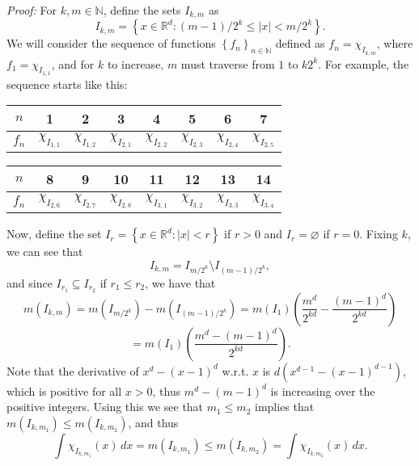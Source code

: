\documentclass[12pt]{article}
\newcommand{\N}{\ensuremath{\mathbb{N}}}
\newcommand{\R}{\ensuremath{\mathbb{R}}}
\newcommand{\braceb}[1]{\left\{#1\right\}}
\newcommand{\parenb}[1]{\left(#1\right)}
\newcommand{\vertb}[1]{\left\vert#1\right\vert}
\newcommand{\sdiff}{\setminus}
\newcommand{\proof}{\textit{Proof: }}
\begin{document}
\proof
For \( k, m \in \N \), define the sets \( I_{k,m} \) as
\[
	I_{k,m}
	= \braceb{x \in \R^d : (m - 1)/2^k \leq \vertb{x} < m/2^k}.
\]
We will consider the sequence of functions \( \braceb{f_n}_{n \in \N} \)
defined as \( f_n = \chi_{I_{k,m}} \), where \( f_1 = \chi_{I_{1,1}} \),
and for \( k \) to increase, \( m \) must traverse from \( 1 \) to \( k2^k \).
For example, the sequence starts like this:
\begin{center}
	\begin{tabular}{cccccccc}
		\toprule
		\( n \) & 1                    & 2 & 3 & 4 & 5 & 6 & 7 \\
		\midrule
		\( f_n \)
		        & \( \chi_{I_{1,1}} \)
		        & \( \chi_{I_{1,2}} \)
		        & \( \chi_{I_{2,1}} \)
		        & \( \chi_{I_{2,2}} \)
		        & \( \chi_{I_{2,3}} \)
		        & \( \chi_{I_{2,4}} \)
		        & \( \chi_{I_{2,5}} \)                         \\
		\bottomrule
	\end{tabular}
\end{center}
\begin{center}
	\begin{tabular}{cccccccc}
		\toprule
		\( n \) & 8                    & 9 & 10 & 11 & 12 & 13 & 14 \\
		\midrule
		\( f_n \)
		        & \( \chi_{I_{2,6}} \)
		        & \( \chi_{I_{2,7}} \)
		        & \( \chi_{I_{2,8}} \)
		        & \( \chi_{I_{3,1}} \)
		        & \( \chi_{I_{3,2}} \)
		        & \( \chi_{I_{3,3}} \)
		        & \( \chi_{I_{3,4}} \)                              \\
		\bottomrule
	\end{tabular}
\end{center}
Now, define the set \( I_r = \braceb{x \in \R^d: \vertb{x} < r} \) if
\( r > 0 \) and \( I_r = \varnothing \) if \( r = 0 \).
Fixing \( k \), we can see that
\[
	I_{k,m} = I_{m/2^k} \sdiff I_{(m - 1)/2^k},
\]
and since \( I_{r_1} \subseteq I_{r_2} \) if \( r_1 \leq r_2 \), we have
that
\[
	m(I_{k,m}) = m(I_{m/2^k}) - m(I_{(m - 1)/2^k})
	= m(I_1)\parenb{\frac{m^d}{2^{kd}} - \frac{(m - 1)^d}{2^{kd}}}
\]
\[
	= m(I_1)\parenb{\frac{m^d - (m - 1)^d}{2^{kd}}}.
\]
Note that the derivative of \( x^d - (x - 1)^d \) w.r.t. \( x \) is
\( d(x^{d - 1} - (x - 1)^{d - 1}) \), which is positive for all
\( x > 0 \), thus \( m^d - (m - 1)^d \) is increasing over the positive
integers.
Using this we see that \( m_1 \leq m_2 \) implies that
\( m(I_{k,m_1}) \leq m(I_{k,m_2}) \), and thus
\[
	\int \chi_{I_{k,m_1}}(x) \, dx
	= m(I_{k,m_1})
	\leq m(I_{k,m_2})
	= \int \chi_{I_{k,m_2}}(x) \, dx.
\]
\end{document}
